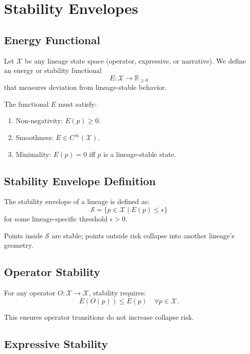 
\section{Stability Envelopes}
\label{sec:stability-envelopes}

\subsection{Energy Functional}

Let $\mathcal{X}$ be any lineage state space (operator, expressive, or narrative).
We define an energy or stability functional
\[
E : \mathcal{X} \rightarrow \mathbb{R}_{\ge 0}
\]
that measures deviation from lineage-stable behavior.

The functional $E$ must satisfy:

\begin{enumerate}
    \item Non-negativity: $E(p) \ge 0$.
    \item Smoothness: $E \in C^\infty(\mathcal{X})$.
    \item Minimality: $E(p) = 0$ iff $p$ is a lineage-stable state.
\end{enumerate}

\subsection{Stability Envelope Definition}

The stability envelope of a lineage is defined as:
\[
\mathcal{S} = \{ p \in \mathcal{X} \mid E(p) \le \epsilon \}
\]
for some lineage-specific threshold $\epsilon > 0$.

Points inside $\mathcal{S}$ are stable; points outside risk collapse into
another lineage’s geometry.

\subsection{Operator Stability}

For any operator $O : \mathcal{X} \rightarrow \mathcal{X}$, stability requires:
\[
E(O(p)) \le E(p) \quad \forall p \in \mathcal{X}.
\]

This ensures operator transitions do not increase collapse risk.

\subsection{Expressive Stability}

